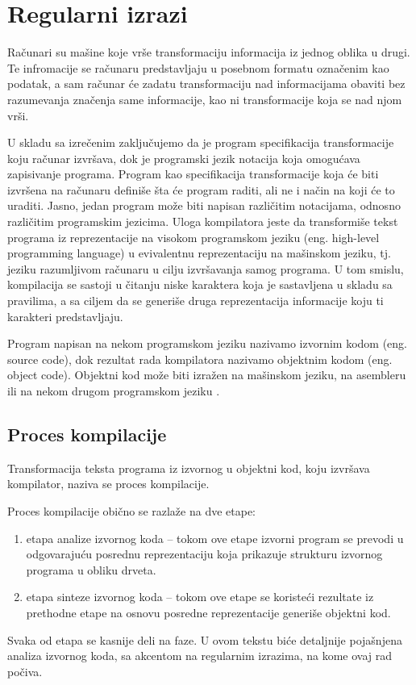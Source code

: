 \documentclass[12pt,oneside]{memoir}
\theoremstyle{plain}
\theoremstyle{definition}
\begin{document}
\chapter{Regularni izrazi}
Računari su mašine koje vrše transformaciju informacija iz jednog oblika u drugi. Te infromacije se računaru predstavljaju u posebnom formatu označenim  kao podatak, a sam računar će zadatu transformaciju nad informacijama obaviti bez razumevanja značenja same informacije, kao ni transformacije koja se nad njom vrši.

U skladu sa izrečenim zaključujemo da je program specifikacija transformacije koju računar izvršava, dok je programski jezik notacija koja omogućava zapisivanje programa. Program kao specifikacija transformacije koja će biti izvršena na računaru definiše šta će program raditi, ali ne i način na koji će to uraditi. Jasno, jedan program može biti napisan različitim notacijama, odnosno različitim programskim jezicima. Uloga kompilatora jeste da transformiše tekst programa iz reprezentacije na visokom programskom jeziku (eng. high-level programming language) u evivalentnu reprezentaciju na mašinskom jeziku, tj. jeziku razumljivom računaru u cilju izvršavanja samog programa. U tom smislu, kompilacija se sastoji u čitanju niske karaktera koja je sastavljena u skladu sa pravilima, a sa ciljem da se generiše druga reprezentacija informacije koju ti karakteri predstavljaju.

Program napisan na nekom programskom jeziku nazivamo izvornim kodom  (eng. source code), dok rezultat rada kompilatora nazivamo objektnim kodom (eng. object code). Objektni kod može biti izražen na mašinskom jeziku, na asembleru ili na nekom drugom programskom jeziku \cite{Vitas}. 

\section{Proces kompilacije}
Transformacija teksta programa iz izvornog u objektni kod, koju izvršava kompilator, naziva se proces kompilacije.

Proces kompilacije obično se razlaže na dve etape:
\begin{enumerate}
\item etapa analize izvornog koda – tokom ove etape izvorni program se prevodi u odgovarajuću posrednu reprezentaciju koja prikazuje strukturu izvornog programa u obliku drveta.
\item etapa sinteze izvornog koda – tokom ove etape se koristeći rezultate iz prethodne etape na osnovu posredne reprezentacije generiše objektni kod.
\end{enumerate}
Svaka od etapa se kasnije deli na faze. U ovom tekstu biće detaljnije pojašnjena analiza izvornog koda, sa akcentom na regularnim izrazima, na kome ovaj rad počiva.
\end{document}
